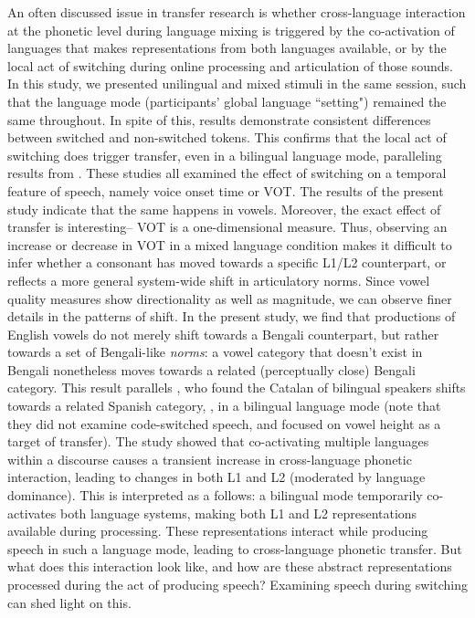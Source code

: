 \documentclass[12 pt]{article}
\newcommand{\nt}[1]{\textipa{[#1]}} %
\begin{document}
An often discussed issue in transfer research is whether cross-language interaction at the phonetic level during language mixing is triggered by the co-activation of languages that makes representations from both languages available, or by the local act of switching during online processing and articulation of those sounds. In this study, we presented unilingual and mixed stimuli in the same session, such that the language mode (participants' global language ``setting") remained the same throughout. In spite of this, results demonstrate consistent differences between switched and non-switched tokens. This confirms that the local act of switching does trigger transfer, even in a bilingual language mode, paralleling results from \cite{olson2016role, tsui2019impact, piccinini2015voice}. These studies all examined the effect of switching on a temporal feature of speech, namely voice onset time or VOT. The results of the present study indicate that the same happens in vowels. Moreover, the exact effect of transfer is interesting-- VOT is a one-dimensional measure. Thus, observing an increase or decrease in VOT in a mixed language condition makes it difficult to infer whether a consonant has moved towards a specific L1/L2 counterpart, or reflects a more general system-wide shift in articulatory norms. Since vowel quality measures show directionality as well as magnitude, we can observe finer details in the patterns of shift. In the present study, we find that productions of English vowels do not merely shift towards a Bengali counterpart, but rather towards a set of Bengali-like \textit{norms}: a vowel category that doesn't exist in Bengali nonetheless moves towards a related (perceptually close) Bengali category. This result parallels \cite{simonet2014phonetic}, who found the Catalan \nt{O} of bilingual speakers shifts towards a related Spanish category, \nt{o}, in a bilingual language mode (note that they did not examine code-switched speech, and focused on vowel height as a target of transfer). The study showed that co-activating multiple languages within a discourse causes a transient increase in cross-language phonetic interaction, leading to changes in both L1 and L2 (moderated by language dominance). This is interpreted as a follows: a bilingual mode temporarily co-activates both language systems, making both L1 and L2 representations available during processing. These representations interact while producing speech in such a language mode, leading to cross-language phonetic transfer. But what does this interaction look like, and how are these abstract representations processed during the act of producing speech? Examining speech during switching can shed light on this.
\end{document}
